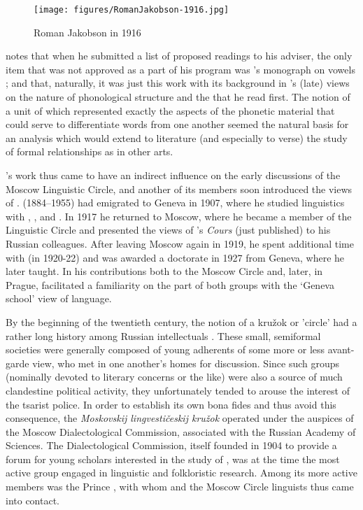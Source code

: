 \begin{wrapfigure}{l}{.35\textwidth}
  \texttt{[image: figures/RomanJakobson-1916.jpg]}
  \caption{Roman Jakobson in 1916}
  \label{fig:ch.prague_jakobson_1916}
\end{wrapfigure}
\citet[631]{jakobson62:retrospect} notes that when he submitted a
list of proposed readings to his adviser, the only item that was not
approved as a part of his program was {}'s monograph on 
vowels \citep{shcherba12:russian.vowels}; and that, naturally, it was
just this work with its background in {\DeCourtenay}'s (late)
views on the nature of phonological structure and the  that he
read first. The notion of a unit of  which represented
exactly the aspects of the phonetic material that could serve to
differentiate words from one another seemed the natural basis for an
analysis which would extend to literature (and especially to verse)
the study of formal relationships as in other arts.

{\Baudouin}'s work thus came to have an indirect influence on the early
discussions of the Moscow Linguistic Circle, and another of its
members soon introduced the views of {\Saussure}. 
(1884--1955) had emigrated to Geneva in 1907, where he studied
linguistics with {\Saussure}, {\Bally}, and {\Sechehaye}. In 1917 he returned
to Moscow, where he became a member of the Linguistic Circle and
presented the views of {\Saussure}'s \textsl{Cours} (just published) to
his {Russian} colleagues. After leaving Moscow again in 1919, he spent
additional time with {\Meillet} (in 1920-22) and was awarded a doctorate
in 1927 from Geneva, where he later taught. In his contributions both
to the Moscow Circle and, later, in Prague, {\Karcevskij} facilitated a
familiarity on the part of both groups with the `Geneva school' view
of language.

By the beginning of the twentieth century, the notion of a kružok or
'circle' had a rather long history among {Russian} intellectuals
\citep{jakobson65:terms}. These small, semi­formal societies were
generally composed of young adherents of some more or less avant-garde
view, who met in one another's homes for discussion. Since such groups
(nominally devoted to literary concerns or the like) were also a
source of much clandestine political activity, they unfortunately
tended to arouse the interest of the tsarist police. In order to
establish its own bona fides and thus avoid this consequence, the
\emph{Moskovskij lingvestičeskij kružok} operated under the auspices
of the Moscow Dialectological Commission, associated with the {Russian}
Academy of Sciences. The Dialectological Commission, itself founded in
1904 to provide a forum for young scholars interested in the study of
, was at the time the most active group engaged in linguistic
and folkloristic research. Among its more active members was the
Prince , with whom {\Jakobson} and the Moscow
Circle linguists thus came into contact.

